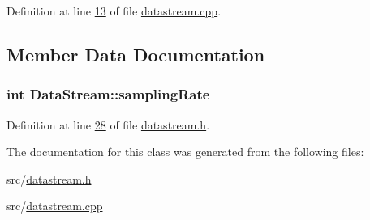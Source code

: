 Definition at line \hyperlink{datastream_8cpp_source_l00013}{13} of file \hyperlink{datastream_8cpp_source}{datastream.\+cpp}.



\subsection{Member Data Documentation}
\subsubsection[{sampling\+Rate}]{\setlength{\rightskip}{0pt plus 5cm}int Data\+Stream\+::sampling\+Rate}\hypertarget{classDataStream_a5b27985e1e797aad7dead2fa690b1638}{}\label{classDataStream_a5b27985e1e797aad7dead2fa690b1638}


Definition at line \hyperlink{datastream_8h_source_l00028}{28} of file \hyperlink{datastream_8h_source}{datastream.\+h}.



The documentation for this class was generated from the following files\+:\begin{DoxyCompactItemize}
\item 
src/\hyperlink{datastream_8h}{datastream.\+h}\item 
src/\hyperlink{datastream_8cpp}{datastream.\+cpp}\end{DoxyCompactItemize}
